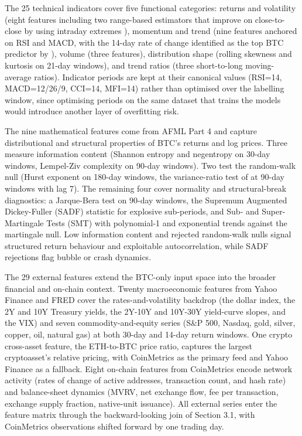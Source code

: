 \documentclass[12pt,a4paper,oneside]{article}
\begin{document}
The 25 technical indicators cover five functional categories: returns and volatility (eight features including two range-based estimators that improve on close-to-close by using intraday extremes \citep{garman_klass_1980, yang_zhang_2000}), momentum and trend (nine features anchored on RSI and MACD, with the 14-day rate of change identified as the top BTC predictor by \citet{mate_confluence_2024}), volume (three features), distribution shape (rolling skewness and kurtosis on 21-day windows), and trend ratios (three short-to-long moving-average ratios). Indicator periods are kept at their canonical values (RSI=14, MACD=12/26/9, CCI=14, MFI=14) rather than optimised over the labelling window, since optimising periods on the same dataset that trains the models would introduce another layer of overfitting risk.

The nine mathematical features come from AFML Part 4 \citep{lopez_de_prado_2018} and capture distributional and structural properties of BTC's returns and log prices. Three measure information content (Shannon entropy and negentropy on 30-day windows, Lempel-Ziv complexity on 90-day windows). Two test the random-walk null (Hurst exponent on 180-day windows, the variance-ratio test of \citet{lo_mackinlay_1988} at 90-day windows with lag 7). The remaining four cover normality and structural-break diagnostics: a Jarque-Bera test on 90-day windows, the Supremum Augmented Dickey-Fuller (SADF) statistic for explosive sub-periods, and Sub- and Super-Martingale Tests (SMT) with polynomial-1 and exponential trends against the martingale null. Low information content and rejected random-walk nulls signal structured return behaviour and exploitable autocorrelation, while SADF rejections flag bubble or crash dynamics.

The 29 external features extend the BTC-only input space into the broader financial and on-chain context. Twenty macroeconomic features from Yahoo Finance and FRED cover the rates-and-volatility backdrop (the dollar index, the 2Y and 10Y Treasury yields, the 2Y-10Y and 10Y-30Y yield-curve slopes, and the VIX) and seven commodity-and-equity series (S\&P 500, Nasdaq, gold, silver, copper, oil, natural gas) at both 30-day and 14-day return windows. One crypto cross-asset feature, the ETH-to-BTC price ratio, captures the largest cryptoasset's relative pricing, with CoinMetrics as the primary feed and Yahoo Finance as a fallback. Eight on-chain features from CoinMetrics encode network activity (rates of change of active addresses, transaction count, and hash rate) and balance-sheet dynamics (MVRV, net exchange flow, fee per transaction, exchange supply fraction, native-unit issuance). All external series enter the feature matrix through the backward-looking join of Section 3.1, with CoinMetrics observations shifted forward by one trading day.
\end{document}
